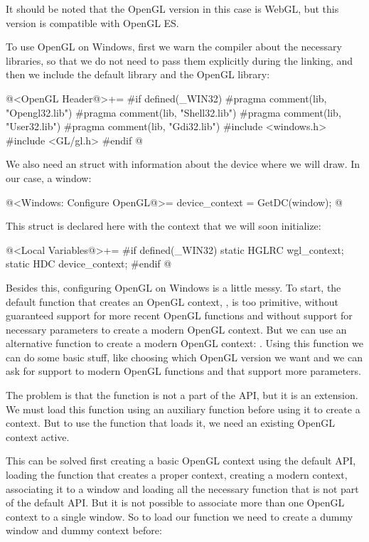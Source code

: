 It should be noted that the OpenGL version in this case is WebGL, but
this version is compatible with OpenGL ES.


To use OpenGL on Windows, first we warn the compiler about the
necessary libraries, so that we do not need to pass them explicitly
during the linking, and then we include the default library and the
OpenGL library:

\iniciocodigo
@<OpenGL Header@>+=
#if defined(_WIN32)
#pragma comment(lib, "Opengl32.lib")
#pragma comment(lib, "Shell32.lib")
#pragma comment(lib, "User32.lib")
#pragma comment(lib, "Gdi32.lib")
#include <windows.h>
#include <GL/gl.h>
#endif
@
\fimcodigo

We also need an struct with information about the device where we will
draw. In our case, a window:

\iniciocodigo
@<Windows: Configure OpenGL@>=
device_context = GetDC(window);
@
\fimcodigo

This struct is declared here with the context that we will soon initialize:

\iniciocodigo
@<Local Variables@>+=
#if defined(_WIN32)
static HGLRC wgl_context;
static HDC device_context;
#endif
@
\fimcodigo

Besides this, configuring OpenGL on Windows is a little messy. To
start, the default function that creates an OpenGL
context, , is too primitive, without
guaranteed support for more recent OpenGL functions and without
support for necessary parameters to create a modern OpenGL
context. But we can use an alternative function to create a modern
OpenGL context: . Using this
function we can do some basic stuff, like choosing which OpenGL
version we want and we can ask for support to modern OpenGL functions
and that support more parameters.

The problem is that the
function  is not a part of the
API, but it is an extension. We must load this function using an
auxiliary function before using it to create a context. But to use the
function that loads it, we need an existing OpenGL context active.

This can be solved first creating a basic OpenGL context using the
default API, loading the function that creates a proper context,
creating a modern context, associating it to a window and loading all
the necessary function that is not part of the default API. But it is
not possible to associate more than one OpenGL context to a single
window. So to load our function we need to create a dummy window and
dummy context before:

